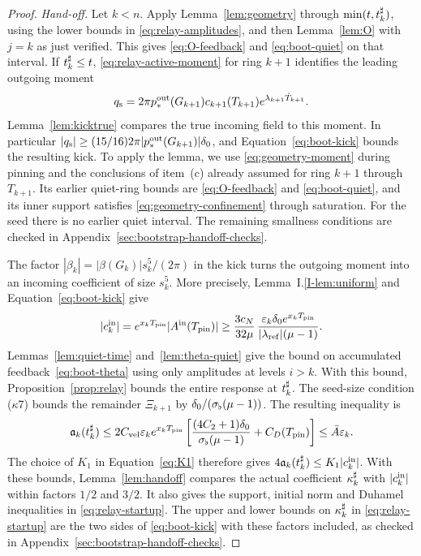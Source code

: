 \begin{proof}
\label{par:relay-handoff}
\emph{Hand-off.}
Let $k<n$. Apply Lemma~\ref{lem:geometry} through $\min(t,t^\sharp_k)$,
using the lower bounds in \eqref{eq:relay-amplitudes}, and then
Lemma~\ref{lem:O} with $j=k$ as just verified. This gives
\eqref{eq:O-feedback} and \eqref{eq:boot-quiet} on that interval.
If $t^\sharp_k\le t$, \eqref{eq:relay-active-moment} for ring $k+1$ identifies
the leading outgoing moment
\begin{equation}
\label{eq:relay-outgoing}
q_{\mathrm{s}}=2\pi p^{\mathrm{out}}_*(G_{k+1})c_{k+1}(T_{k+1})e^{\lambda_{k+1}\hat T_{k+1}}.
\end{equation}
Lemma~\ref{lem:kicktrue} compares the true incoming field to this moment.
In particular $|q_{\mathrm{s}}|\ge(15/16)2\pi|p^{\mathrm{out}}_*(G_{k+1})|\delta_0$, and
Equation~\eqref{eq:boot-kick} bounds the resulting kick. To apply the lemma,
we use \eqref{eq:geometry-moment} during pinning and the conclusions of
item~(c) already assumed for ring $k+1$ through $T_{k+1}$.
Its earlier quiet-ring bounds are \eqref{eq:O-feedback} and
\eqref{eq:boot-quiet}, and its inner support satisfies
\eqref{eq:geometry-confinement} through saturation. For the seed there is no earlier quiet
interval. The remaining smallness conditions are checked in
Appendix~\ref{sec:bootstrap-handoff-checks}.

The factor $|\beta_k|=|\beta(G_k)|s_k^5/(2\pi)$ in the kick turns the outgoing
moment into an incoming coefficient of size $s_k^5$. More precisely,
Lemma~I.\ref{I-lem:uniform} and Equation~\eqref{eq:boot-kick} give
\begin{equation}
\label{eq:relay-incoming-lower}
|c^{\mathrm{in}}_k|=e^{x_kT_{\mathrm{pin}}}|A^{\mathrm{in}}(T_{\mathrm{pin}})|
\ge \frac{3c_N}{32\mu}\,
\frac{\varepsilon_k\delta_0 e^{x_kT_{\mathrm{pin}}}}{|\lambda_{\mathrm{ref}}|(\mu-1)}.
\end{equation}
Lemmas~\ref{lem:quiet-time} and~\ref{lem:theta-quiet} give the
bound on accumulated feedback~\eqref{eq:boot-theta} using only amplitudes at levels
$i>k$. With this bound, Proposition~\ref{prop:relay} bounds the entire
response at $t^\sharp_k$. The seed-size condition ($\kappa$7) bounds the remainder
$\Xi_{k+1}$ by $\delta_0/(\sigma_\flat(\mu-1))$. The resulting inequality is
\begin{equation}
\label{eq:relay-startup-duhamel}
\mathfrak{a}_k(t^\sharp_k)\le 2C_{\mathrm{vel}}\varepsilon_k e^{x_kT_{\mathrm{pin}}}
\left[\frac{(4C_2+1)\delta_0}{\sigma_\flat(\mu-1)}+C_D(T_{\mathrm{pin}})\right]
\le\bar A\varepsilon_k.
\end{equation}
The choice of $K_1$ in Equation~\eqref{eq:K1} therefore gives
$4\mathfrak{a}_k(t^\sharp_k)\le K_1|c^{\mathrm{in}}_k|$. With these bounds,
Lemma~\ref{lem:handoff} compares the actual coefficient $\kappa^\sharp_k$
with $|c^{\mathrm{in}}_k|$ within factors $1/2$ and $3/2$. It also gives the support,
initial norm and Duhamel inequalities in \eqref{eq:relay-startup}.
The upper and lower bounds on $\kappa^\sharp_k$ in \eqref{eq:relay-startup} are
the two sides of \eqref{eq:boot-kick} with these factors included,
as checked in Appendix~\ref{sec:bootstrap-handoff-checks}.


\end{proof}
